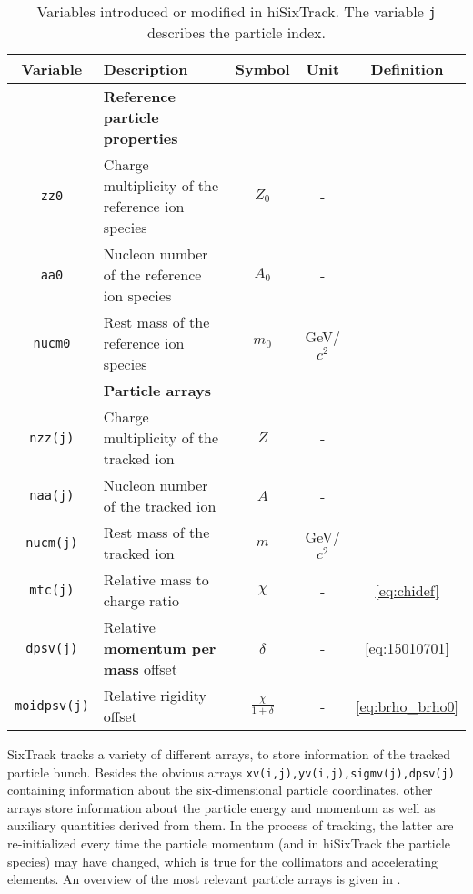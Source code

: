 \begin{appendices}
\begin{table}[b]
\centering
\caption{Variables introduced or modified in hiSixTrack. The variable \texttt{j} describes the particle index.}
\label{tab:hisixtrack_variables}
\begin{tabular}{clccc}
\toprule
Variable             & Description           & Symbol & Unit & Definition\\ \midrule
 & \textbf{Reference particle properties} \\ \midrule
\texttt{zz0}           &  Charge multiplicity of the reference ion species    & $Z_0$     & - &       \\
\texttt{aa0}           &  Nucleon number of the reference ion species         & $A_0$     & - &       \\
\texttt{nucm0}         &  Rest mass of the reference ion species              & $m_0$     & GeV/$c^2$ &       \\ \midrule
 & \textbf{Particle arrays} \\ \midrule
\texttt{nzz(j)}        &  Charge multiplicity of the tracked ion              & $Z$       & - &       \\
\texttt{naa(j)}        &  Nucleon number of the tracked ion                   & $A$       & - &       \\
\texttt{nucm(j)}       &  Rest mass of the tracked ion                        & $m$       & GeV/$c^2$ & \\
\texttt{mtc(j)}        &  Relative mass to charge ratio                       & $\chi$    & - & \eqref{eq:chidef}      \\
\texttt{dpsv(j)}       &  Relative \textbf{momentum per mass} offset          & $\delta$  & -    & \eqref{eq:15010701}     \\
\texttt{moidpsv(j)}    &  Relative rigidity offset  & $\frac{\chi}{1+\delta}$    & - &   \eqref{eq:brho_brho0}   \\ \bottomrule
\end{tabular}
\end{table}

SixTrack tracks a variety of different arrays, to store information of the tracked particle bunch. Besides the obvious arrays \lstinline{xv(i,j),yv(i,j),sigmv(j),dpsv(j)} containing information about the six-dimensional particle coordinates, other arrays store information about the particle energy and momentum as well as auxiliary quantities derived from them. In the process of tracking, the latter are re-initialized every time the particle momentum (and in hiSixTrack the particle species) may have changed, which is true for the collimators and accelerating elements. An overview of the most relevant particle arrays is given in .


\end{appendices}
